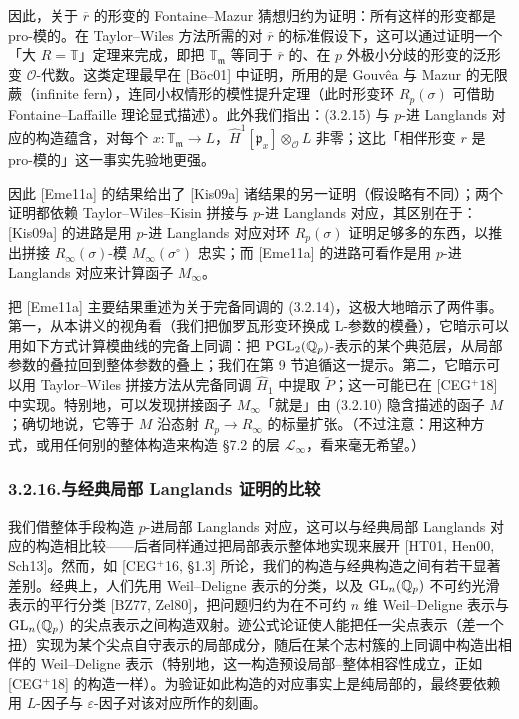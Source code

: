 因此，关于 $\overline{r}$ 的形变的 Fontaine--Mazur 猜想归约为证明：所有这样的形变都是 pro-模的。在 Taylor--Wiles 方法所需的对 $\overline{r}$ 的标准假设下，这可以通过证明一个「大 $R=\mathbb T$」定理来完成，即把 $\mathbb T_{\mathfrak m}$ 等同于 $\overline{r}$ 的、在 $p$ 外极小分歧的形变的泛形变 $\mathcal O$-代数。这类定理最早在 [Böc01] 中证明，所用的是 Gouvêa 与 Mazur 的无限蕨（infinite fern），连同小权情形的模性提升定理（此时形变环 $R_p(\sigma)$ 可借助 Fontaine--Laffaille 理论显式描述）。此外我们指出：(3.2.15) 与 $p$-进 Langlands 对应的构造蕴含，对每个 $x:\mathbb T_{\mathfrak m}\to L$，$\widehat H^1[\mathfrak p_x]\otimes_{\mathcal O}L$ 非零；这比「相伴形变 $r$ 是 pro-模的」这一事实先验地更强。

因此 [Eme11a] 的结果给出了 [Kis09a] 诸结果的另一证明（假设略有不同）；两个证明都依赖 Taylor--Wiles--Kisin 拼接与 $p$-进 Langlands 对应，其区别在于：[Kis09a] 的进路是用 $p$-进 Langlands 对应对环 $R_p(\sigma)$ 证明足够多的东西，以推出拼接 $R_\infty(\sigma)$-模 $M_\infty(\sigma^{\circ})$ 忠实；而 [Eme11a] 的进路可看作是用 $p$-进 Langlands 对应来计算函子 $M_\infty$。

把 [Eme11a] 主要结果重述为关于完备同调的 (3.2.14)，这极大地暗示了两件事。第一，从本讲义的视角看（我们把伽罗瓦形变环换成 L-参数的模叠），它暗示可以用如下方式计算模曲线的完备上同调：把 $\mathrm{PGL}_2(\mathbb{Q}_p)$-表示的某个典范层，从局部参数的叠拉回到整体参数的叠上；我们在第 9 节追循这一提示。第二，它暗示可以用 Taylor--Wiles 拼接方法从完备同调 $\widehat H_1$ 中提取 $\widetilde P$；这一可能已在 [CEG$^+$18] 中实现。特别地，可以发现拼接函子 $M_\infty$「就是」由 (3.2.10) 隐含描述的函子 $M$；确切地说，它等于 $M$ 沿态射 $R_p\to R_\infty$ 的标量扩张。（不过注意：用这种方式，或用任何别的整体构造来构造 §7.2 的层 $\mathcal L_\infty$，看来毫无希望。）

\subsubsection*{3.2.16.\quad 与经典局部 Langlands 证明的比较}

我们借整体手段构造 $p$-进局部 Langlands 对应，这可以与经典局部 Langlands 对应的构造相比较——后者同样通过把局部表示整体地实现来展开 [HT01, Hen00, Sch13]。然而，如 [CEG$^+$16, §1.3] 所论，我们的构造与经典构造之间有若干显著差别。经典上，人们先用 Weil--Deligne 表示的分类，以及 $\mathrm{GL}_n(\mathbb{Q}_p)$ 不可约光滑表示的平行分类 [BZ77, Zel80]，把问题归约为在不可约 $n$ 维 Weil--Deligne 表示与 $\mathrm{GL}_n(\mathbb{Q}_p)$ 的尖点表示之间构造双射。迹公式论证使人能把任一尖点表示（差一个扭）实现为某个尖点自守表示的局部成分，随后在某个志村簇的上同调中构造出相伴的 Weil--Deligne 表示（特别地，这一构造预设局部--整体相容性成立，正如 [CEG$^+$18] 的构造一样）。为验证如此构造的对应事实上是纯局部的，最终要依赖用 $L$-因子与 $\varepsilon$-因子对该对应所作的刻画。

